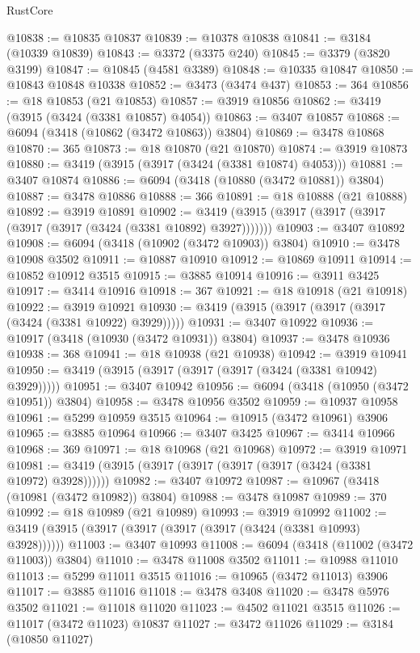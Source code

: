 \begin{lexlean}{RustCore}
\begin{coremodule}
@10838 := @10835 @10837
@10839 := @10378 @10838
@10841 := @3184 (@10339 @10839)
@10843 := @3372 (@3375 @240)
@10845 := @3379 (@3820 @3199)
@10847 := @10845 (@4581 @3389)
@10848 := @10335 @10847
@10850 := @10843 @10848 @10338
@10852 := @3473 (@3474 @437)
@10853 := 364
@10856 := @18 @10853 (@21 @10853)
@10857 := @3919 @10856
@10862 := @3419 (@3915 (@3424 (@3381 @10857) @4054))
@10863 := @3407 @10857
@10868 := @6094 (@3418 (@10862 (@3472 @10863)) @3804)
@10869 := @3478 @10868
@10870 := 365
@10873 := @18 @10870 (@21 @10870)
@10874 := @3919 @10873
@10880 := @3419 (@3915 (@3917 (@3424 (@3381 @10874) @4053)))
@10881 := @3407 @10874
@10886 := @6094 (@3418 (@10880 (@3472 @10881)) @3804)
@10887 := @3478 @10886
@10888 := 366
@10891 := @18 @10888 (@21 @10888)
@10892 := @3919 @10891
@10902 := @3419 (@3915 (@3917 (@3917 (@3917 (@3917 (@3917 (@3424 (@3381 @10892) @3927)))))))
@10903 := @3407 @10892
@10908 := @6094 (@3418 (@10902 (@3472 @10903)) @3804)
@10910 := @3478 @10908 @3502
@10911 := @10887 @10910
@10912 := @10869 @10911
@10914 := @10852 @10912 @3515
@10915 := @3885 @10914
@10916 := @3911 @3425
@10917 := @3414 @10916
@10918 := 367
@10921 := @18 @10918 (@21 @10918)
@10922 := @3919 @10921
@10930 := @3419 (@3915 (@3917 (@3917 (@3917 (@3424 (@3381 @10922) @3929)))))
@10931 := @3407 @10922
@10936 := @10917 (@3418 (@10930 (@3472 @10931)) @3804)
@10937 := @3478 @10936
@10938 := 368
@10941 := @18 @10938 (@21 @10938)
@10942 := @3919 @10941
@10950 := @3419 (@3915 (@3917 (@3917 (@3917 (@3424 (@3381 @10942) @3929)))))
@10951 := @3407 @10942
@10956 := @6094 (@3418 (@10950 (@3472 @10951)) @3804)
@10958 := @3478 @10956 @3502
@10959 := @10937 @10958
@10961 := @5299 @10959 @3515
@10964 := @10915 (@3472 @10961) @3906
@10965 := @3885 @10964
@10966 := @3407 @3425
@10967 := @3414 @10966
@10968 := 369
@10971 := @18 @10968 (@21 @10968)
@10972 := @3919 @10971
@10981 := @3419 (@3915 (@3917 (@3917 (@3917 (@3917 (@3424 (@3381 @10972) @3928))))))
@10982 := @3407 @10972
@10987 := @10967 (@3418 (@10981 (@3472 @10982)) @3804)
@10988 := @3478 @10987
@10989 := 370
@10992 := @18 @10989 (@21 @10989)
@10993 := @3919 @10992
@11002 := @3419 (@3915 (@3917 (@3917 (@3917 (@3917 (@3424 (@3381 @10993) @3928))))))
@11003 := @3407 @10993
@11008 := @6094 (@3418 (@11002 (@3472 @11003)) @3804)
@11010 := @3478 @11008 @3502
@11011 := @10988 @11010
@11013 := @5299 @11011 @3515
@11016 := @10965 (@3472 @11013) @3906
@11017 := @3885 @11016
@11018 := @3478 @3408
@11020 := @3478 @5976 @3502
@11021 := @11018 @11020
@11023 := @4502 @11021 @3515
@11026 := @11017 (@3472 @11023) @10837
@11027 := @3472 @11026
@11029 := @3184 (@10850 @11027)

\end{coremodule}
\end{lexlean}
